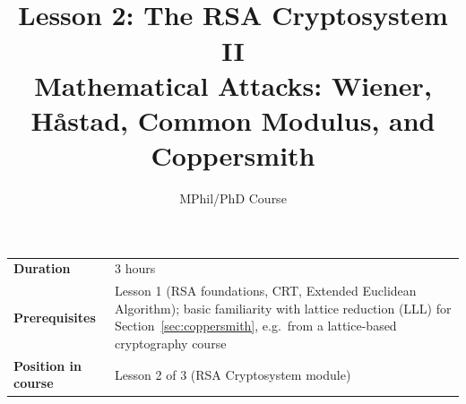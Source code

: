 \documentclass[11pt]{article}
\title{\textbf{\seriestitle} \\ \Large Lesson 2: The RSA Cryptosystem II \\ \large Mathematical Attacks: Wiener, Håstad, Common Modulus, and Coppersmith}
\author{MPhil/PhD Course}
\date{}
\begin{document}
\maketitle

\begin{center}
\begin{tabular}{ll}
\toprule
\textbf{Duration} & 3 hours \\
\textbf{Prerequisites} & Lesson 1 (RSA foundations, CRT, Extended Euclidean Algorithm); basic familiarity with lattice reduction (LLL) for Section~\ref{sec:coppersmith}, e.g.\ from a lattice-based cryptography course \\
\textbf{Position in course} & Lesson 2 of 3 (RSA Cryptosystem module) \\
\bottomrule
\end{tabular}
\end{center}



\end{document}
